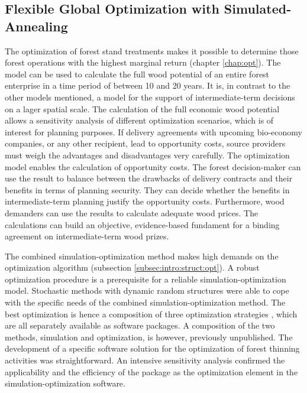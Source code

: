 \subsection{Flexible Global Optimization with Simulated-Annealing}
\label{subsec:discussion:struct:opt}
The optimization of forest stand treatments makes it possible to determine those forest operations with the highest marginal return (chapter \ref{chap:opt}). The model can be used to calculate the full wood potential of an entire forest enterprise in a time period of between 10 and 20 years. It is, in contrast to the other models mentioned, a model for the support of intermediate-term decisions on a lager spatial scale. The calculation of the full economic wood potential allows a sensitivity analysis of different optimization scenarios, which is of interest for planning purposes. If delivery agreements with upcoming bio-economy companies, or any other recipient, lead to opportunity costs, source providers must weigh the advantages and disadvantages very carefully. The optimization model enables the calculation of opportunity costs. The forest decision-maker can use the result to balance between the drawbacks of delivery contracts and their benefits in terms of planning security. They can decide whether the benefits in intermediate-term planning justify the opportunity costs. Furthermore, wood demanders can use the results to calculate adequate wood prices. The calculations can build an objective, evidence-based fundament for a binding agreement on intermediate-term wood prizes.

The combined si\-mu\-la\-tion-op\-ti\-mi\-za\-tion method makes high demands on the optimization algorithm (subsection \ref{subsec:intro:struct:opt}). A robust optimization procedure is a prerequisite for a reliable si\-mu\-la\-tion-op\-ti\-mi\-za\-tion model. Stochastic methods with dynamic random structures were able to cope with the specific needs of the combined si\-mu\-la\-tion-op\-ti\-mi\-za\-tion method. The best optimization is hence a composition of three optimization strategies \citep{corana_1987, kirkpatrick_1983, pronzato_1984}, which are all separately available as software packages. A composition of the two methods, simulation and optimization, is however, previously unpublished. The development of a specific software solution for the optimization of forest thinning activities was straightforward. An intensive sensitivity analysis confirmed the applicability and the efficiency of the package as the optimization element in the si\-mu\-la\-tion-op\-ti\-mi\-za\-tion software.

